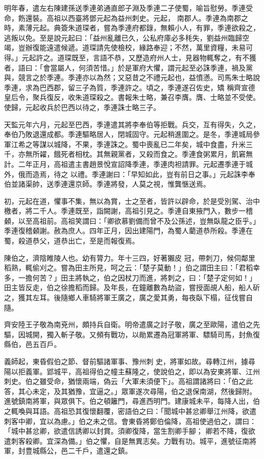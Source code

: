 \begin{pinyinscope}
 明年春，遣左右陳建孫送季連弟通直郎子淵及季連二子使蜀，喻旨慰勞。季連受命，飭還裝。高祖以西臺將鄧元起為益州刺史。元起，
 南郡人。季連為南郡之時，素薄元起。典簽朱道琛者，嘗為季連府都錄，無賴小人，有罪，季連欲殺之，逃叛以免。至是說元起曰：「益州亂離已久，公私府庫必多秏失，劉益州臨歸空竭，豈辦復能遠遣候遞。道琛請先使檢校，緣路奉迎；不然，萬里資糧，未易可得。」元起許之。道琛既至，言語不恭，又歷造府州人士，見器物輒奪之，有不獲者，語曰：「會當屬人，何須苦惜。」於是軍府大懼，謂元起至必誅季連，禍及黨與，競言之於季連。季連亦以為然；又惡昔之不禮元起也，益憤懣。司馬朱士略說季連，求為巴西郡，留三子為質，季連許之。頃之，季連遂召佐史，矯
 稱齊宣德皇后令，聚兵復反，收朱道琛殺之。書報朱士略，兼召李膺。膺、士略並不受使。使歸，元起收兵於巴西以待之，季連誅士略三子。



 天監元年六月，元起至巴西，季連遣其將李奉伯等拒戰。兵交，互有得失，久之，奉伯乃敗退還成都。季連驅略居人，閉城固守。元起稍進圍之。是冬，季連城局參軍江希之等謀以城降，不果，季連誅之。蜀中喪亂已二年矣，城中食盡，升米三千，亦無所糴，餓死者相枕。其無親黨者，又殺而食之。季連食粥累月，飢窘無計。二年正月，高祖遣主書趙景悅宣詔降季連，季連肉袒請罪。元起遷季連于城外，俄而造焉，待之
 以禮。季連謝曰：「早知如此，豈有前日之事。」元起誅李奉伯並諸渠帥，送季連還京師。季連將發，人莫之視，惟龔愜送焉。



 初，元起在道，懼事不集，無以為賞，士之至者，皆許以辟命，於是受別駕、治中檄者，將二千人。季連既至，詣闕謝，高祖引見之。季連自東掖門入，數步一稽顙，以至高祖前。高祖笑謂曰：「卿欲慕劉備而曾不及公孫述，豈無臥龍之臣乎。」季連復稽顙謝。赦為庶人。四年正月，因出建陽門，為蜀人藺道恭所殺。季連在蜀，殺道恭父，道恭出亡，至是而報復焉。



 陳伯之，濟陰睢陵人也。幼有膂力。年十三四，好著獺皮
 冠，帶刺刀，候伺鄰里稻熟，輒偷刈之。嘗為田主所見，呵之云：「楚子莫動！」伯之謂田主曰：「君稻幸多，一擔何苦？」田主將執之，伯之因杖刀而進，將刺之，曰：「楚子定何如！」田主皆反走，伯之徐擔稻而歸。及年長，在鐘離數為劫盜，嘗授面覘人船，船人斫之，獲其左耳。後隨鄉人車騎將軍王廣之，廣之愛其勇，每夜臥下榻，征伐嘗自隨。



 齊安陸王子敬為南兗州，頗持兵自衛。明帝遣廣之討子敬，廣之至歐陽，遣伯之先驅，因城開，獨入斬子敬。又頻有戰功，以勛累遷為冠軍將軍、驃騎司馬，封魚復縣伯，邑五百戶。



 義師起，東昏假伯之節、督前驅諸軍事、豫州刺
 史，將軍如故。尋轉江州，據尋陽以拒義軍。郢城平，高祖得伯之幢主蘇隆之，使說伯之，即以為安東將軍、江州刺史。伯之雖受命，猶懷兩端，偽云「大軍未須便下」。高祖謂諸將曰：「伯之此答，其心未定，及其猶豫，宜逼之。」眾軍遂次尋陽，伯之退保南湖，然後歸附。進號鎮南將軍，與眾俱下。伯之頓籬門，尋進西明門。建康城未平，每降人出，伯之輒喚與耳語。高祖恐其復懷翻覆，密語伯之曰：「聞城中甚忿卿舉江州降，欲遣刺客中卿，宜以為慮。」伯之未之信。會東昏將鄭伯倫降，高祖使過伯之，謂曰：「城中甚忿卿，欲遣信誘卿以封賞。須卿復降，當生割卿手腳；
 卿若不降，復欲遣刺客殺卿。宜深為備。」伯之懼，自是無異志矣。力戰有功。城平，進號征南將軍，封豊城縣公，邑二千戶，遣還之鎮。




\end{pinyinscope}
